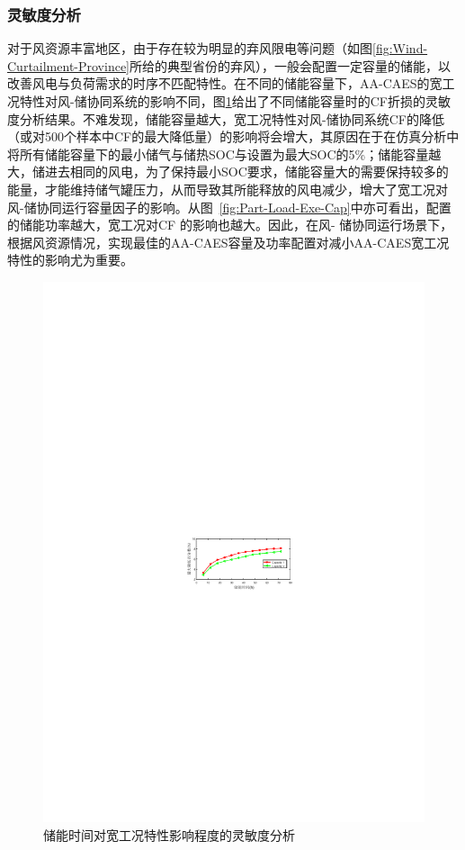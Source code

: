 \subsubsection{灵敏度分析}
对于风资源丰富地区，由于存在较为明显的弃风限电等问题（如图\ref{fig:Wind-Curtailment-Province}所给的典型省份的弃风），一般会配置一定容量的储能，以改善风电与负荷需求的时序不匹配特性。在不同的储能容量下，AA-CAES的宽工况特性对风-储协同系统的影响不同，图\ref{fig:Part-Load-Exe-Str-Sen}给出了不同储能容量时的CF折损的灵敏度分析结果。不难发现，储能容量越大，宽工况特性对风-储协同系统CF的降低（或对500个样本中CF的最大降低量）的影响将会增大，其原因在于在仿真分析中将所有储能容量下的最小储气与储热SOC与设置为最大SOC的5\%；储能容量越大，储进去相同的风电，为了保持最小SOC要求，储能容量大的需要保持较多的能量，才能维持储气罐压力，从而导致其所能释放的风电减少，增大了宽工况对风-储协同运行容量因子的影响。从图~\ref{fig:Part-Load-Exe-Cap}中亦可看出，配置的储能功率越大，宽工况对CF 的影响也越大。因此，在风- 储协同运行场景下，根据风资源情况，实现最佳的AA-CAES容量及功率配置对减小AA-CAES宽工况特性的影响尤为重要。

\begin{figure}[H] %
  \centering
  \includegraphics[scale=1.75]{figures/Chap3-15-Part-Load-Exe-Str-Sen.pdf}
  \caption{储能时间对宽工况特性影响程度的灵敏度分析}
  \label{fig:Part-Load-Exe-Str-Sen}
\end{figure}

